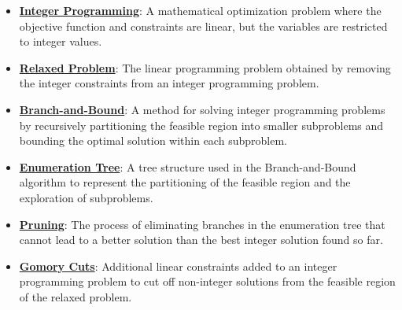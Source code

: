 \documentclass{article}%
\begin{document}
\begin{itemize}[leftmargin=*]%
\item \href{https://www.math.purdue.edu/~yipn/421/2024-10-31-IntLinProg.pdf#page=1}{\textbf{Integer Programming}}: A mathematical optimization problem where the objective function and constraints are linear, but the variables are restricted to integer values.%
\item \href{https://www.math.purdue.edu/~yipn/421/2024-10-31-IntLinProg.pdf#page=2}{\textbf{Relaxed Problem}}: The linear programming problem obtained by removing the integer constraints from an integer programming problem.%
\item \href{https://www.math.purdue.edu/~yipn/421/2024-10-31-IntLinProg.pdf#page=5}{\textbf{Branch{-}and{-}Bound}}: A method for solving integer programming problems by recursively partitioning the feasible region into smaller subproblems and bounding the optimal solution within each subproblem.%
\item \href{https://www.math.purdue.edu/~yipn/421/2024-10-31-IntLinProg.pdf#page=6}{\textbf{Enumeration Tree}}: A tree structure used in the Branch-and-Bound algorithm to represent the partitioning of the feasible region and the exploration of subproblems.%
\item \href{https://www.math.purdue.edu/~yipn/421/2024-10-31-IntLinProg.pdf#page=11}{\textbf{Pruning}}: The process of eliminating branches in the enumeration tree that cannot lead to a better solution than the best integer solution found so far.%
\item \href{https://www.math.purdue.edu/~yipn/421/2024-10-31-IntLinProg.pdf#page=15}{\textbf{Gomory Cuts}}: Additional linear constraints added to an integer programming problem to cut off non-integer solutions from the feasible region of the relaxed problem.%
\end{itemize}%
\end{document}
